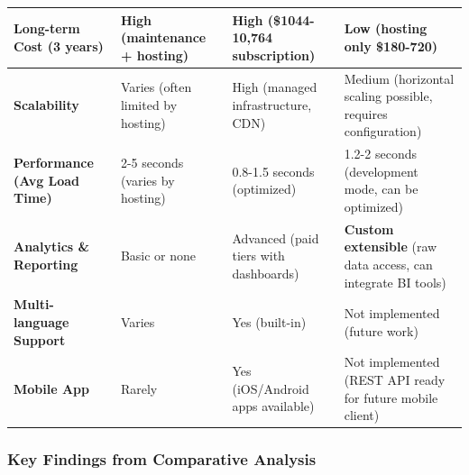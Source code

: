 \begin{table}[H]
\begin{tabular}{|p{2.8cm}|p{3cm}|p{3cm}|p{3.8cm}|}
\hline
\textbf{Long-term Cost (3 years)} & High (maintenance + hosting) & High (\$1044-10,764 subscription) & \textbf{Low} (hosting only \$180-720) \\
\hline
\textbf{Scalability} & Varies (often limited by hosting) & High (managed infrastructure, CDN) & Medium (horizontal scaling possible, requires configuration) \\
\hline
\textbf{Performance (Avg Load Time)} & 2-5 seconds (varies by hosting) & 0.8-1.5 seconds (optimized) & 1.2-2 seconds (development mode, can be optimized) \\
\hline
\textbf{Analytics \& Reporting} & Basic or none & Advanced (paid tiers with dashboards) & \textbf{Custom extensible} (raw data access, can integrate BI tools) \\
\hline
\textbf{Multi-language Support} & Varies & Yes (built-in) & Not implemented (future work) \\
\hline
\textbf{Mobile App} & Rarely & Yes (iOS/Android apps available) & Not implemented (REST API ready for future mobile client) \\
\hline
\end{tabular}
\end{table}

\subsubsection*{Key Findings from Comparative Analysis}

